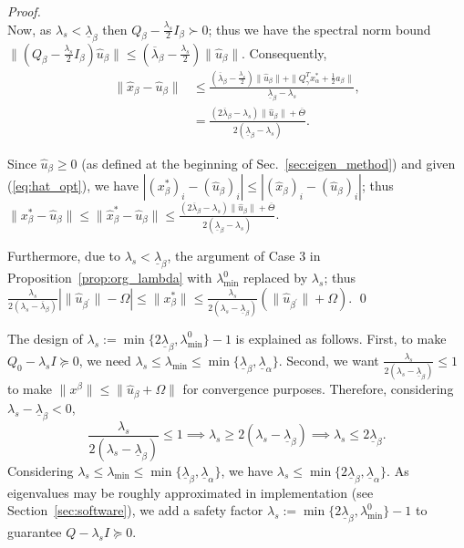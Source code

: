 \documentclass[]{article}
\begin{document}
\begin{proof}
\begin{equation}
    \end{equation} 
    Now, as $\lambda_s < \underline{\lambda}_\beta$ then $Q_\beta-\frac{\lambda_s}{2}I_\beta \succ 0$; thus we have the spectral norm bound $\|(Q_\beta-\frac{\lambda_s}{2}I_\beta)\hat{u}_\beta\| \leq (\overline{\lambda}_\beta - \frac{\lambda_s}{2})\|\hat{u}_\beta\|$. Consequently,
    \begin{equation}\label{eq:upper_bound}
    \begin{aligned}
        \|\hat{x}_\beta-\hat{u}_\beta\| & \leq \frac{(\overline{\lambda}_\beta - \frac{\lambda_s}{2})\|\hat{u}_\beta\| + \|Q_\gamma^T x_\alpha^* + \frac{1}{2}a_\beta\|}{\underline{\lambda}_\beta-\lambda_s},\\
        &=  \frac{(2\overline{\lambda}_\beta - \lambda_s)\|\hat{u}_\beta\| + \overline{\Theta}}{2(\underline{\lambda}_\beta-\lambda_s)}.
    \end{aligned}
    \end{equation}

    Since $\hat{u}_\beta \geq 0$ (as defined at the beginning of Sec.~\ref{sec:eigen_method}) and given (\ref{eq:hat_opt}), we have $|(x^*_\beta)_i - (\hat{u}_\beta)_i| \leq |(\hat{x}_\beta)_i - (\hat{u}_\beta)_i|$; thus $\|x^*_\beta - \hat{u}_\beta\| \leq \|\hat{x}^*_\beta-\hat{u}_\beta\| \leq \frac{(2\overline{\lambda}_\beta - \lambda_s)\|\hat{u}_\beta\| + \overline{\Theta}}{2(\underline{\lambda}_\beta-\lambda_s)}$.

    Furthermore, due to $\lambda_s <\underline{\lambda}_\beta$, the argument of Case 3 in Proposition~\ref{prop:org_lambda} with $\lambda^0_{\min}$ replaced by $\lambda_s$; thus $\frac{\lambda_s}{2(\lambda_s - \overline{\lambda}_\beta)}|\|\hat{u}_{\beta^\prime}\| - \Omega| \leq \|x_\beta^*\| \leq \frac{\lambda_s}{2(\lambda_s - \underline{\lambda}_\beta)}(\|\hat{u}_{\beta^\prime}\| + \Omega)$.
    \qed
\end{proof}

The design of $\lambda_s := \min\{2\underline{\lambda}_\beta,\lambda_{\min}^0\}-1$ is explained as follows. First, to make $Q_0-\lambda_s I \succeq 0$, we need $\lambda_s \leq \lambda_{\min}\leq\min\{\underline{\lambda}_{\beta}, \underline{\lambda}_{\alpha}\}$. Second, we want $\frac{\lambda_s}{2(\lambda_s-\underline{\lambda}_{\beta})}\leq 1$ to make $\|x^{\beta}\|\leq \|\hat{u}_\beta +\Omega\|$ for convergence purposes. Therefore, considering $\lambda_s-\underline{\lambda}_{\beta}< 0$, 
\[\frac{\lambda_s}{2(\lambda_s-\underline{\lambda}_{\beta})} \leq 1\implies \lambda_s \geq 2(\lambda_s-\underline{\lambda}_{\beta})\implies \lambda_s\leq 2\underline{\lambda}_{\beta}.\]
Considering $\lambda_s \leq \lambda_{\min}\leq\min\{\underline{\lambda}_{\beta}, \underline{\lambda}_{\alpha}\}$, we have $\lambda_s \leq \min\{2\underline{\lambda}_\beta,\underline{\lambda}_\alpha\}$. As eigenvalues may be roughly approximated in implementation (see Section~\ref{sec:software}), we add a safety factor $\lambda_s := \min\{2\underline{\lambda}_\beta,\lambda_{\min}^0\}-1$ to guarantee $Q - \lambda_sI \succeq 0$.
\end{document}
